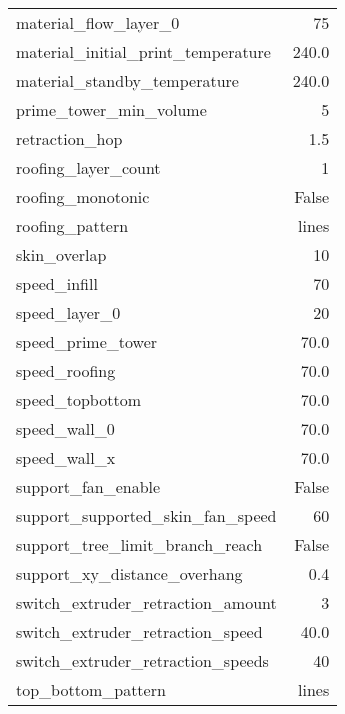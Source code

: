 \begin{multicols}{2}
\begin{table}[H]
\begin{tabular}{ |l|r| }
            material\_flow\_layer\_0              & 75             \\
            material\_initial\_print\_temperature & 240.0          \\
            material\_standby\_temperature        & 240.0          \\
            prime\_tower\_min\_volume             & 5              \\
            retraction\_hop                       & 1.5            \\
            roofing\_layer\_count                 & 1              \\
            roofing\_monotonic                    & False          \\
            roofing\_pattern                      & lines          \\
            skin\_overlap                         & 10             \\
            speed\_infill                         & 70             \\
            speed\_layer\_0                       & 20             \\
            speed\_prime\_tower                   & 70.0           \\
            speed\_roofing                        & 70.0           \\
            speed\_topbottom                      & 70.0           \\
            speed\_wall\_0                        & 70.0           \\
            speed\_wall\_x                        & 70.0           \\
            support\_fan\_enable                  & False          \\
            support\_supported\_skin\_fan\_speed  & 60             \\
            support\_tree\_limit\_branch\_reach   & False          \\
            support\_xy\_distance\_overhang       & 0.4            \\
            switch\_extruder\_retraction\_amount  & 3              \\
            switch\_extruder\_retraction\_speed   & 40.0           \\
            switch\_extruder\_retraction\_speeds  & 40             \\
            top\_bottom\_pattern                  & lines          \\

\end{tabular}
\end{table}
\end{multicols}

